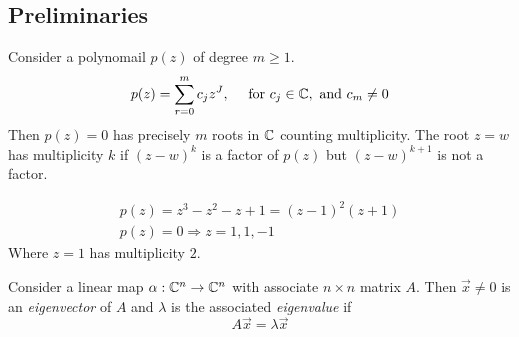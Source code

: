 \documentclass{article}
\numberwithin{equation}{section}
\begin{document}
\subsection{Preliminaries}
\begin{thm}
    Consider a polynomail $p(z)$ of degree $m \geq 1$.
    \[
        p(z) = \sum_{r = 0}^{m} c_j z^J, \quad \text{ for } c_j \in \mathbb{C}, \text{ and } c_m \neq 0
    \]
    Then $p(z) = 0$ has precisely $m$ roots in $\mathbb{C}$ counting multiplicity.
    The root $z = w$ has multiplicity $k$ if $(z - w)^k$ is a factor of $p(z)$ but $(z - w)^{k + 1}$ is not a factor.
\end{thm}
\begin{eg}
    \begin{align*}
        p(z) = z^3 - z^2 - z + 1 = (z - 1)^2(z + 1) \\
        p(z) = 0 \Rightarrow z = 1, 1, -1
    \end{align*}
    Where $z = 1$ has multiplicity $2$.
\end{eg}

\begin{defi}
    Consider a linear map $\alpha: \mathbb{C}^n \rightarrow \mathbb{C}^n$ with associate $n \times n$ matrix $A$.
    Then $\vec x \neq 0$ is an \emph{eigenvector} of $A$ and $\lambda$ is the associated \emph{eigenvalue} if
    \begin{equation}\label{eq:5-1}
        A \vec x = \lambda \vec x 
    \end{equation}
\end{defi}
\end{document}
